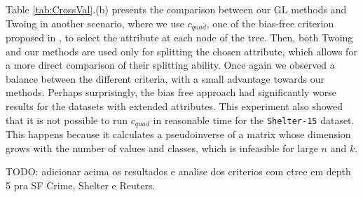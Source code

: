 Table \ref{tab:CrossVal}.(b) presents the 
comparison between our GL methods and Twoing in another scenario,
where we use $c_{quad}$, one of the bias-free   criterion proposed in \cite{Hothorn:2006:URP}, to select the attribute at each node of the tree. 
Then, both Twoing and our methods are  used only for splitting the chosen attribute,  which allows for a  more direct comparison of their splitting ability. Once again we observed a balance between the different criteria, with a small advantage towards our methods. Perhaps surprisingly, the bias free approach had significantly worse results for the datasets with extended attributes. This experiment also showed that it is not possible to run $c_{quad}$ in reasonable time for the {\tt Shelter-15} dataset. This happens because it calculates a pseudoinverse of a matrix whose dimension grows with the number of values and classes, which is infeasible for large $n$ and $k$.

TODO: adicionar acima os resultados e analise dos criterios com ctree em depth 5 pra SF Crime, Shelter e Reuters.


